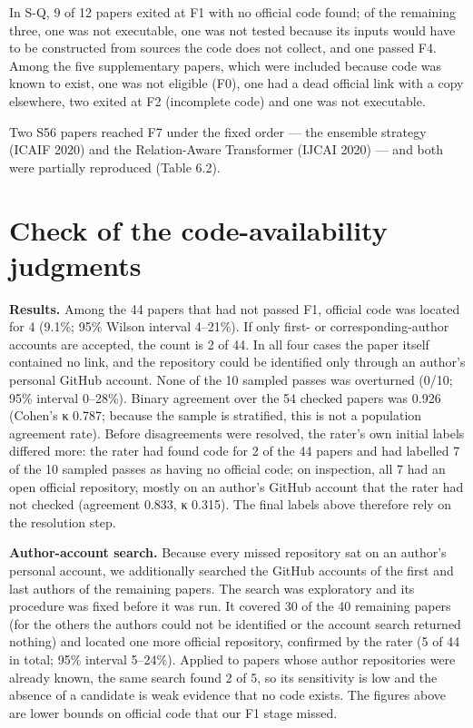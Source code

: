 \documentclass[12pt,a4paper]{report}
\begin{document}
In S-Q, 9 of 12 papers exited at F1 with no official code found; of the
remaining three, one was not executable, one was not tested because its
inputs would have to be constructed from sources the code does not
collect, and one passed F4. Among the five supplementary papers, which
were included because code was known to exist, one was not eligible
(F0), one had a dead official link with a copy elsewhere, two exited at
F2 (incomplete code) and one was not executable.

Two S56 papers reached F7 under the fixed order --- the ensemble
strategy (ICAIF 2020) and the Relation-Aware Transformer (IJCAI 2020)
--- and both were partially reproduced (Table 6.2).

\section{Check of the code-availability
judgments}\label{check-of-the-code-availability-judgments}

\textbf{Results.} Among the 44 papers that had not passed F1, official
code was located for 4 (9.1\%; 95\% Wilson interval 4--21\%). If only
first- or corresponding-author accounts are accepted, the count is 2 of
44. In all four cases the paper itself contained no link, and the
repository could be identified only through an author's personal GitHub
account. None of the 10 sampled passes was overturned (0/10; 95\%
interval 0--28\%). Binary agreement over the 54 checked papers was 0.926
(Cohen's κ 0.787; because the sample is stratified, this is not a
population agreement rate). Before disagreements were resolved, the
rater's own initial labels differed more: the rater had found code for 2
of the 44 papers and had labelled 7 of the 10 sampled passes as having
no official code; on inspection, all 7 had an open official repository,
mostly on an author's GitHub account that the rater had not checked
(agreement 0.833, κ 0.315). The final labels above therefore rely on the
resolution step.

\textbf{Author-account search.} Because every missed repository sat on
an author's personal account, we additionally searched the GitHub
accounts of the first and last authors of the remaining papers. The
search was exploratory and its procedure was fixed before it was run. It
covered 30 of the 40 remaining papers (for the others the authors could
not be identified or the account search returned nothing) and located
one more official repository, confirmed by the rater (5 of 44 in total;
95\% interval 5--24\%). Applied to papers whose author repositories were
already known, the same search found 2 of 5, so its sensitivity is low
and the absence of a candidate is weak evidence that no code exists. The
figures above are lower bounds on official code that our F1 stage
missed.
\end{document}
